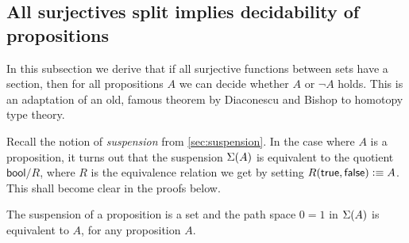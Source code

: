 \subsection{All surjectives split implies decidability of propositions}\label{sec:surj-split}
In this subsection we derive that if all surjective functions between sets have
a section, then for all propositions $A$ we can decide whether $A$ or $\neg A$
holds. This is an adaptation of an old, famous theorem by
Diaconescu and Bishop to homotopy type theory.

Recall the notion of \emph{suspension} from \autoref{sec:suspension}.
In the case where $A$ is a proposition, it turns out that the
suspension $\Sigma(A)$ is equivalent to the quotient $\mathsf{bool}/R$,
where $R$ is the equivalence relation we get by setting
$R(\mathsf{true},\mathsf{false})\vcentcolon\equiv A$. This shall become clear in the proofs
below.

\begin{lem}\label{prop:trunc_of_prop_is_set}
The suspension of a proposition is a set and the path space 
$0=1$ in $\Sigma(A)$ is equivalent to $A$, for any proposition $A$. 
\end{lem}

